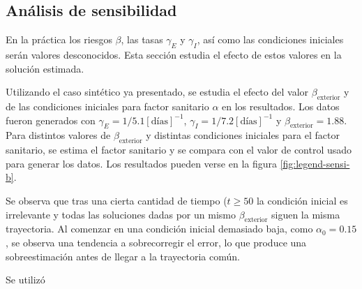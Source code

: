 \subsection{Análisis de sensibilidad}


En la práctica los riesgos \(\beta \), las tasas \(\gamma_E\) y \(\gamma_I\), así como las condiciones iniciales serán valores desconocidos. Esta sección estudia el efecto de estos valores en la solución estimada. 

Utilizando el caso sintético ya presentado, se estudia el efecto del valor \(\beta_{\text{exterior}}\) y de las condiciones iniciales para factor sanitario \(\alpha\) en los resultados. Los datos fueron generados con \(\gamma_E = 1/5.1 [\text{días}]^{-1}\), \(\gamma_I = 1/7.2 [\text{días}]^{-1}\) y \(\beta_{\text{exterior}} = 1.88\). Para distintos valores de \(\beta_{\text{exterior}}\) y distintas condiciones iniciales para el factor sanitario, se estima el factor sanitario y se compara con el valor de control usado para generar los datos. Los resultados pueden verse en la figura \ref{fig:legend-sensi-b}.

Se observa que tras una cierta cantidad de tiempo (\(t \geq 50\) la condición inicial es irrelevante y todas las soluciones dadas por un mismo \(\beta_{\text{exterior}}\) siguen la misma trayectoria. Al comenzar en una condición inicial demasiado baja, como \(\alpha_0 = 0.15\), se observa una tendencia a sobrecorregir el error, lo que produce una sobreestimación antes de llegar a la trayectoria común.

Se utilizó 





